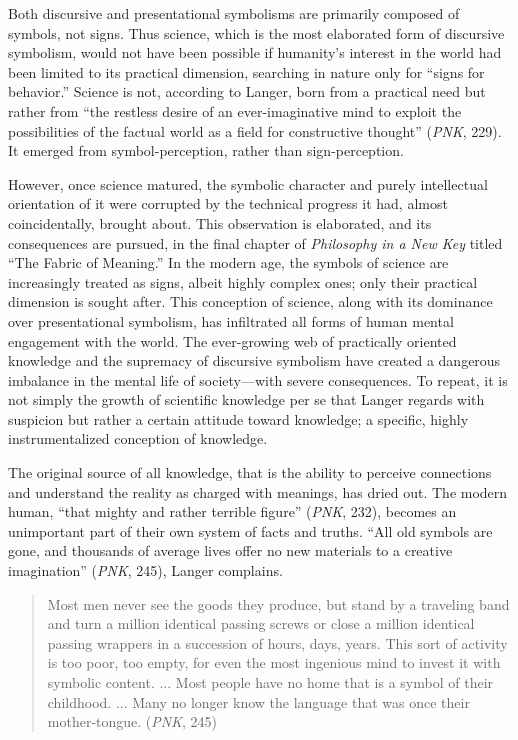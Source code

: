 \documentclass{tufte-handout}
\begin{document}
Both discursive and presentational symbolisms are primarily composed of
symbols, not signs. Thus science, which is the most elaborated form of
discursive symbolism, would not have been possible if humanity's
interest in the world had been limited to its practical dimension,
searching in nature only for ``signs for behavior.'' Science is not,
according to Langer, born from a practical need but rather from ``the
restless desire of an ever-imaginative mind to exploit the possibilities
of the factual world as a field for constructive thought'' (\emph{PNK},
229). It emerged from symbol-perception, rather than sign-perception.

However, once science matured, the symbolic character and purely
intellectual orientation of it were corrupted by the technical progress
it had, almost coincidentally, brought about. This observation is
elaborated, and its consequences are pursued, in the final chapter of
\emph{Philosophy in a New Key} titled ``The Fabric of Meaning.'' In the
modern age, the symbols of science are increasingly treated as signs,
albeit highly complex ones; only their practical dimension is sought
after. This conception of science, along with its dominance over
presentational symbolism, has infiltrated all forms of human mental
engagement with the world. The ever-growing web of practically oriented
knowledge and the supremacy of discursive symbolism have created a
dangerous imbalance in the mental life of society---with severe
consequences. To repeat, it is not simply the growth of scientific
knowledge per se that Langer regards with suspicion but rather a certain
attitude toward knowledge; a specific, highly instrumentalized
conception of knowledge.

The original source of all knowledge, that is the ability to perceive
connections and understand the reality as charged with meanings, has
dried out. The modern human, ``that mighty and rather terrible figure''
(\emph{PNK}, 232), becomes an unimportant part of their own system of
facts and truths. ``All old symbols are gone, and thousands of average
lives offer no new materials to a creative imagination'' (\emph{PNK},
245), Langer complains.

\begin{quote}
Most men never see the goods they produce, but stand by a traveling band
and turn a million identical passing screws or close a million identical
passing wrappers in a succession of hours, days, years. This sort of
activity is too poor, too empty, for even the most ingenious mind to
invest it with symbolic content. ... Most people have no home that is a
symbol of their childhood. ... Many no longer know the language that was
once their mother-tongue. (\emph{PNK}, 245)
\end{quote}
\end{document}
